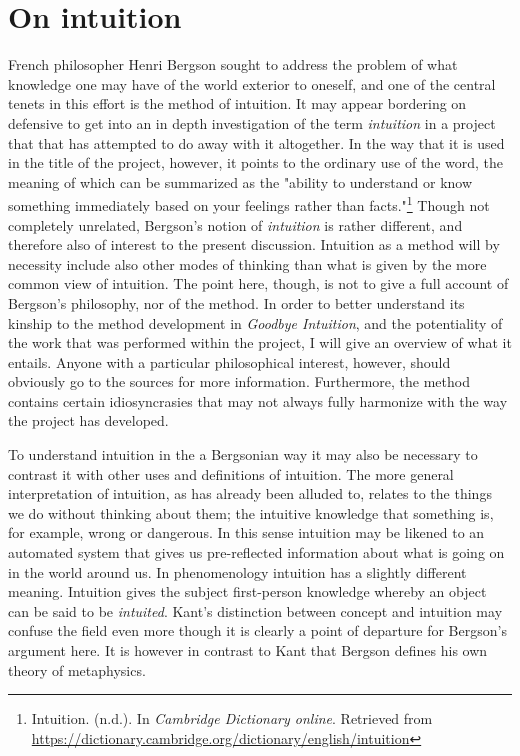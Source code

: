 \documentclass[11pt]{article}
\begin{document}
\section*{On intuition}
\label{sec:orge977bb5}
French philosopher Henri Bergson sought to address the problem of what knowledge one may have of the world exterior to oneself, and one of the central tenets in this effort is the method of intuition. It may appear bordering on defensive to get into an in depth investigation of the term \emph{intuition} in a project that that has attempted to do away with it altogether. In the way that it is used in the title of the project, however, it points to the ordinary use of the word, the meaning of which can be summarized as the "ability to understand or know something immediately based on your feelings rather than facts."\footnote{Intuition. (n.d.). In \emph{Cambridge Dictionary online}. Retrieved from \url{https://dictionary.cambridge.org/dictionary/english/intuition}} Though not completely unrelated, Bergson's notion of \emph{intuition} is rather different, and therefore also of interest to the present discussion. Intuition as a method will by necessity include also other modes of thinking than what is given by the more common view of intuition. The point here, though, is not to give a full account of Bergson's philosophy, nor of the method. In order to better understand its kinship to the method development in \emph{Goodbye Intuition}, and the potentiality of the work that was performed within the project, I will give an overview of what it entails. Anyone with a particular philosophical interest, however, should obviously go to the sources for more information. Furthermore, the method contains certain idiosyncrasies that may not always fully harmonize with the way the project has developed.

To understand intuition in the a Bergsonian way it may also be necessary to contrast it with other uses and definitions of intuition. The more general interpretation of intuition, as has already been alluded to, relates to the things we do without thinking about them; the intuitive knowledge that something is, for example, wrong or dangerous. In this sense intuition may be likened to an automated system that gives us pre-reflected information about what is going on in the world around us. In phenomenology intuition has a slightly different meaning. Intuition gives the subject first-person knowledge whereby an object can be said to be \emph{intuited}. Kant's distinction between concept and intuition may confuse the field even more though it is clearly a point of departure for Bergson's argument here. It is however in contrast to Kant that Bergson defines his own theory of metaphysics.
\end{document}
